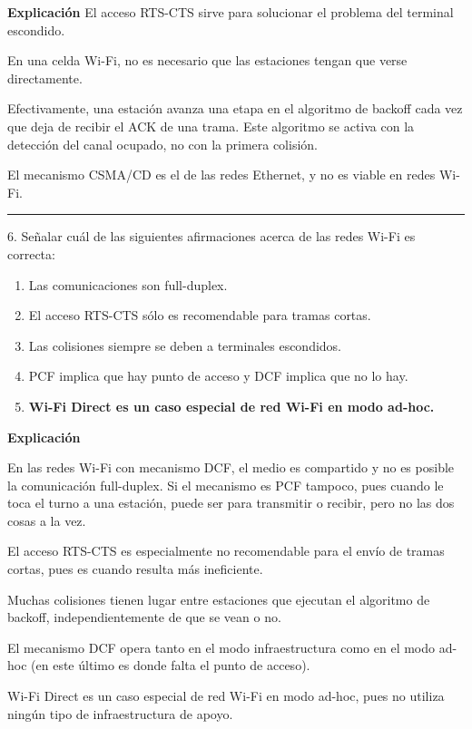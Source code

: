 \documentclass[10pt,a4paper]{article}
\begin{document}
\textbf{Explicación}
El acceso RTS-CTS sirve para solucionar el problema del terminal escondido.

En una celda Wi-Fi, no es necesario que las estaciones tengan que verse directamente.

Efectivamente, una estación avanza una etapa en el algoritmo de backoff cada vez que deja de recibir el ACK de una trama. Este algoritmo se activa con la detección del canal ocupado, no con la primera colisión.

El mecanismo CSMA/CD es el de las redes Ethernet, y no es viable en redes Wi-Fi.

\vspace{15pt} \hrule \vspace{15pt}




6.  Señalar cuál de las siguientes afirmaciones acerca de las redes Wi-Fi es correcta:


\begin{enumerate}[label=\alph*]
    \item Las comunicaciones son full-duplex.
    \item El acceso RTS-CTS sólo es recomendable para tramas cortas.
    \item Las colisiones siempre se deben a terminales escondidos.
    \item PCF implica que hay punto de acceso y DCF implica que no lo hay.
    \item \textbf{Wi-Fi Direct es un caso especial de red Wi-Fi en modo ad-hoc.}
\end{enumerate}

\textbf{Explicación}

En las redes Wi-Fi con mecanismo DCF, el medio es compartido y no es posible la comunicación full-duplex. Si el mecanismo es PCF tampoco, pues cuando le toca el turno a una estación, puede ser para transmitir o recibir, pero no las dos cosas a la vez.

El acceso RTS-CTS es especialmente no recomendable para el envío de tramas cortas, pues es cuando resulta más ineficiente.

Muchas colisiones tienen lugar entre estaciones que ejecutan el algoritmo de backoff, independientemente de que se vean o no.

El mecanismo DCF opera tanto en el modo infraestructura como en el modo ad-hoc (en este último es donde falta el punto de acceso).

Wi-Fi Direct es un caso especial de red Wi-Fi en modo ad-hoc, pues no utiliza ningún tipo de infraestructura de apoyo.
\end{document}
